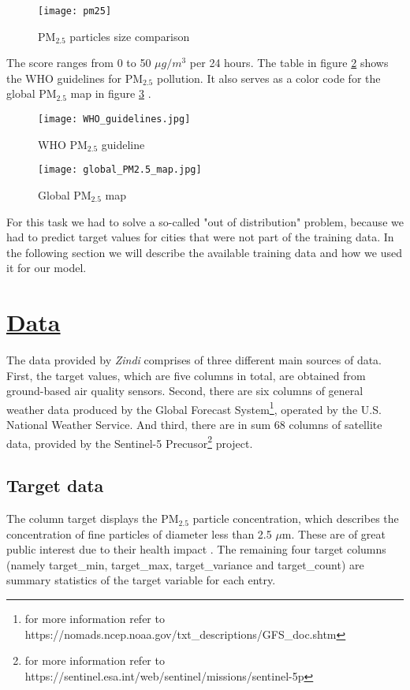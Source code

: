 \documentclass{article}
\begin{document}
\begin{figure}[htb!]
\centering
\texttt{[image: pm25]}
\caption{PM$_{2.5}$ particles size comparison \citep{us_epa_particulate_2016}}
\label{fig:pm25_size}
\end{figure}
The score ranges from 0 to 50 $\mu g / m^3$ per 24 hours. The table in figure \ref{fig:pm25} shows the WHO guidelines for PM$_{2.5}$ pollution. It also serves as a color code for the global PM$_{2.5}$ map in figure \ref{fig:pm25_map} \citep{iqair_empowering}.  \\

\begin{figure}[htb!]
\centering
\texttt{[image: WHO\_guidelines.jpg]}
\caption{WHO PM$_{2.5}$ guideline \citep{iqair_empowering}}
\label{fig:pm25}
\end{figure}

\begin{figure}[htb!]
\centering
\texttt{[image: global\_PM2.5\_map.jpg]}
\caption{Global PM$_{2.5}$ map \citep{iqair_empowering}}
\label{fig:pm25_map}
\end{figure}
For this task we had to solve a so-called "out of distribution" problem, because we had to predict target values for cities that were not part of the training data. 
In the following section we will describe the available training data and how we used it for our model. 
\newpage
\section{\href{https://github.com/tjayada/iANNwTF_Project/tree/main/data/raw\%20data}{Data}}
The data provided by \textit{Zindi} comprises of three different main sources of data. First, the target values, which are five columns in total, are obtained from ground-based air quality sensors. Second, there are six columns of general weather data produced by the Global Forecast System\footnote{for more information refer to https://nomads.ncep.noaa.gov/txt\_descriptions/GFS\_doc.shtm}, operated by the U.S. National Weather Service. And third, there are in sum 68 columns of satellite data, provided by the Sentinel-5 Precusor\footnote{for more information refer to https://sentinel.esa.int/web/sentinel/missions/sentinel-5p} project.

\subsection{Target data}
The column {\selectfont target} displays the PM$_{2.5}$ particle concentration, which describes the concentration of fine particles of diameter less than 2.5 $\mu$m. These are of great public interest due to their health impact  \citep{tai_meteorological_2012}.
The remaining four target columns (namely {\selectfont target\_min}, {\selectfont target\_max}, {\selectfont target\_variance} and {\selectfont target\_count}) are summary statistics of the target variable for each entry.
\end{document}
